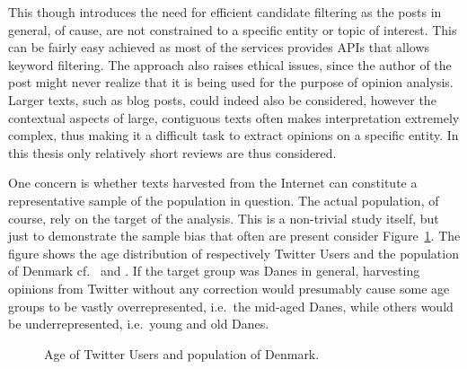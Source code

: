 This though introduces the need for efficient candidate filtering as the posts in general, of cause, are not constrained to a specific entity or topic of interest. This can be fairly easy achieved as most of the services provides APIs that allows keyword filtering.
The approach also raises ethical issues, since the author of the post might never realize that it is being used for the purpose of opinion analysis. Larger texts, such as blog posts, could indeed also be considered, however the contextual aspects of large, contiguous texts often makes interpretation extremely complex, thus making it a difficult task to extract opinions on a specific entity. In this thesis only relatively short reviews are thus considered.

One concern is whether texts harvested from the Internet can constitute a representative sample of the population in question. The actual population, of course, rely on the target of the analysis. This is a non-trivial study itself, but just to demonstrate the sample bias that  often are present consider Figure~\ref{fig:population}. The figure shows the age distribution of respectively Twitter Users and the population of Denmark cf.\ \cite{pingdom} and \cite{euroStat}. If the target group was Danes in general, harvesting opinions from Twitter without any correction would presumably cause some age groups to be vastly overrepresented, i.e.\ the mid-aged Danes, while others would be underrepresented, i.e.\ young and old Danes. 
\begin{figure}[ht]
\begin{center}
\end{center}
\vspace{-1em}
\caption{Age of Twitter Users and population of Denmark.}
\label{fig:population}
\end{figure}
\vspace{-1em}

